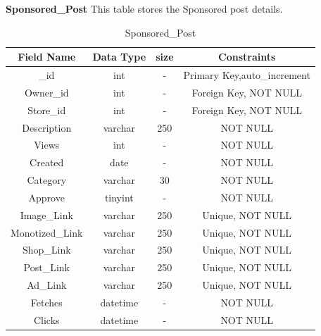 \textbf{Sponsored\_Post} This table stores the Sponsored post details.\nolinebreak
\begin{table}[hp]
\centering
\begin{tabular}{|c|c|c|c|}
\hline
\textbf{Field Name}  & \textbf{Data Type}  & \textbf{size} &\textbf{Constraints}  \\
\hline
\_id &	int &	- & Primary Key,auto\_increment \\\hline
Owner\_id  &	int &	- & Foreign Key, NOT NULL \\\hline
Store\_id &	int &	- & Foreign Key, NOT NULL \\\hline
Description &	 varchar &	250 & NOT NULL \\\hline
Views &	int &	- & NOT NULL \\\hline
Created &	date &	- & NOT NULL \\\hline
Category &	varchar &	30 & NOT NULL \\\hline
Approve &	tinyint &	- & NOT NULL \\\hline
Image\_Link &	varchar &	250 & Unique, NOT NULL \\\hline
Monotized\_Link&	varchar &	250 & Unique, NOT NULL \\\hline
Shop\_Link &	varchar &	250 & Unique, NOT NULL \\\hline
Post\_Link &	varchar &	250 & Unique, NOT NULL \\\hline
Ad\_Link &	varchar & 250 & Unique, NOT NULL \\\hline
Fetches &	datetime &	- & NOT NULL \\\hline
Clicks &	datetime &	- & NOT NULL \\\hline
\end{tabular}
\caption{Sponsored\_Post}
\end{table}


